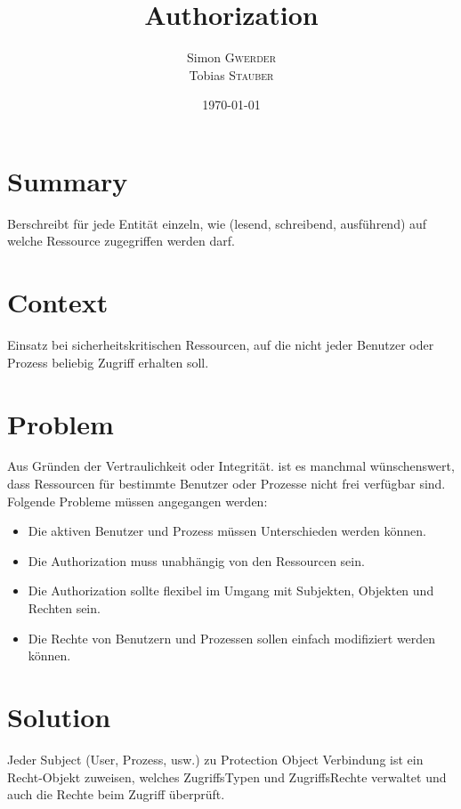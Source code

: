 \documentclass{article}
\title{Authorization} %
\author{Simon \textsc{Gwerder}\\Tobias \textsc{Stauber}} %
\date{\today} %
\begin{document}
	
	\maketitle %
	
	
	\section{Summary}
  Berschreibt für jede Entität einzeln, wie (lesend, schreibend, ausführend) auf welche Ressource zugegriffen werden darf.
	
	\section{Context}
	Einsatz bei sicherheitskritischen Ressourcen, auf die nicht jeder Benutzer oder Prozess beliebig Zugriff erhalten soll.
	
	\section{Problem}
	Aus Gründen der Vertraulichkeit oder Integrität. ist es manchmal wünschenswert, dass Ressourcen für bestimmte Benutzer oder Prozesse nicht frei verfügbar sind. Folgende Probleme müssen angegangen werden:\\
	\begin{itemize}{}{ }
		\item Die aktiven Benutzer und Prozess müssen Unterschieden werden können.
		\item Die Authorization muss unabhängig von den Ressourcen sein.
		\item Die Authorization sollte flexibel im Umgang mit Subjekten, Objekten und Rechten sein.
		\item Die Rechte von Benutzern und Prozessen sollen einfach modifiziert werden können.
	\end{itemize}

\section{Solution}
Jeder Subject (User, Prozess, usw.) zu Protection Object Verbindung ist ein Recht-Objekt zuweisen, welches ZugriffsTypen und ZugriffsRechte verwaltet und auch die Rechte beim Zugriff überprüft.
\end{document}
